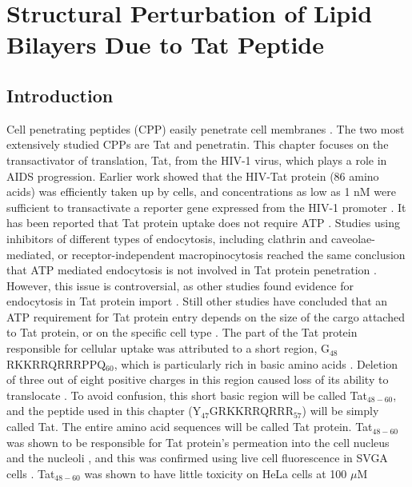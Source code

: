 \chapter{Structural Perturbation of Lipid Bilayers Due to Tat Peptide}
\section{Introduction}\label{sec:Tat_intro}
Cell penetrating peptides (CPP) easily penetrate cell membranes 
\cite{Fischer05,Joliot04,Lindgren00}. 
The two most extensively studied CPPs are Tat and penetratin.
This chapter focuses on 
the transactivator of translation, Tat, from the HIV-1 virus, which plays a 
role in AIDS progression. 
Earlier work showed that the HIV-Tat 
protein (86 amino acids) was efficiently taken up by cells, and concentrations 
as low as 1 nM were sufficient to transactivate a reporter gene expressed from 
the HIV-1 promoter \cite{Frankel88,Green88}. 
It has been reported that Tat protein uptake does not 
require ATP \cite{Vives97}. 
Studies using inhibitors of different types of endocytosis, 
including clathrin and caveolae-mediated, or receptor-independent 
macropinocytosis reached the same conclusion that ATP mediated endocytosis is 
not involved in Tat protein penetration
\cite{TerAvetisyan09,Duchardt07,Tunnemann06,Ziegler05}. 
However, this issue is 
controversial, as other studies found evidence for endocytosis in Tat protein 
import \cite{Wadia04,Kaplan05,Mann91,Richard05,Jones05,Vendeville04,Foerg05,Fittipaldi05,Liu00}. 
Still other studies have concluded that an ATP requirement for 
Tat protein entry depends on the size of the cargo attached to Tat protein, or 
on the specific cell type \cite{Torchilin01,Torchilin03,Rudolph03}. 
The part of the Tat protein responsible for 
cellular uptake was attributed to a short region, G$_{48}$RKKRRQRRRPPQ$_{60}$, 
which is particularly rich in basic amino acids \cite{Vives97}. 
Deletion of three out of 
eight positive charges in this region
caused loss of its ability to translocate \cite{Vives97}. 
To avoid confusion, this short basic region will be called Tat$_{48-60}$,
and the peptide used in this chapter (Y$_{47}$GRKKRRQRRR$_{57}$)
will be simply called Tat. The entire amino acid sequences will
be called Tat protein.
Tat$_{48-60}$ was shown to be responsible for Tat
protein’s permeation into the cell nucleus and the nucleoli \cite{Vives97}, 
and this was confirmed using live cell fluorescence in SVGA cells \cite{Chauhan07}. 
Tat$_{48-60}$ was shown to have little toxicity on HeLa cells at 100 $\mu$M 
